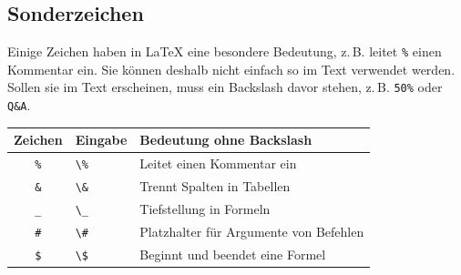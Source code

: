 \subsection{Sonderzeichen}
\label{latex-sonderzeichen}
Einige Zeichen haben in \LaTeX{} eine besondere Bedeutung, z.\,B. leitet \texttt{\%} einen Kommentar ein. Sie können deshalb nicht einfach so im Text verwendet werden. Sollen sie im Text erscheinen, muss ein Backslash davor stehen, z.\,B. \texttt{50\%} oder \texttt{Q\&A}.

\begin{center}
	\begin{tabularx}{\linewidth}{clX}
		\toprule
		\textbf{Zeichen} & \textbf{Eingabe}            & \textbf{Bedeutung ohne Backslash}        \\
		\midrule
		\texttt{\%}      & \texttt{\textbackslash\%}   & Leitet einen Kommentar ein               \\
		\texttt{\&}      & \texttt{\textbackslash\&}   & Trennt Spalten in Tabellen               \\
		\texttt{\_}      & \texttt{\textbackslash\_}   & Tiefstellung in Formeln                  \\
		\texttt{\#}      & \texttt{\textbackslash\#}   & Platzhalter für Argumente von Befehlen   \\
		\texttt{\$}      & \texttt{\textbackslash\$}   & Beginnt und beendet eine Formel          \\
		\bottomrule
	\end{tabularx}
\end{center}

